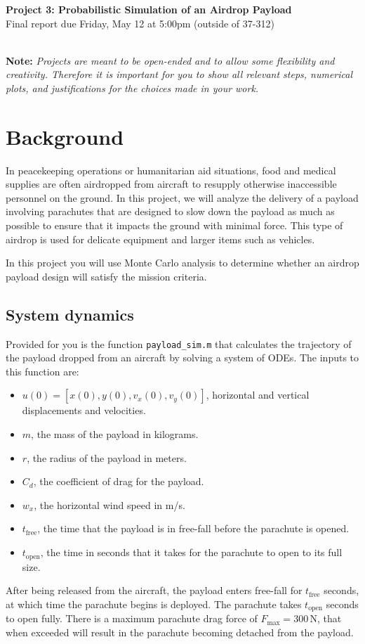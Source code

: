 \documentclass[11pt]{article}
\begin{document}
\begin{center}
\Large\textbf{Project 3: Probabilistic Simulation of an Airdrop Payload}\\[1em]
\normalsize Final report due Friday, May 12 at 5:00pm (outside of 37-312)
\end{center}
\hrulefill\\[1em]
\textbf{Note:} \textit{Projects are meant to be open-ended and to
  allow some flexibility and creativity. Therefore it is important
  for you to show all relevant steps, numerical plots, and
  justifications for the choices made in your work.}

\hrulefill

\section{Background}
In peacekeeping operations or humanitarian aid situations, food and
medical supplies are often airdropped from aircraft to resupply
otherwise inaccessible personnel on the ground. In this project, we
will analyze the delivery of a payload involving parachutes that are
designed to slow down the payload as much as possible to ensure that it impacts the ground with minimal force. This type of airdrop is used for delicate equipment and larger items such as vehicles.

In this project you will use Monte Carlo analysis to determine whether an airdrop payload design will satisfy the mission criteria.

\subsection{System dynamics}
Provided for you is the function \texttt{payload\_sim.m} that calculates the trajectory of the payload dropped from an aircraft by solving a system of ODEs. The inputs to this function are:
\begin{itemize}
  \item $u(0)=[x(0), y(0), v_x(0), v_y(0)]$, horizontal and vertical displacements and velocities.
  \item $m$, the mass of the payload in kilograms.
  \item $r$, the radius of the payload in meters.
  \item $C_d$, the coefficient of drag for the payload.
  \item $w_x$, the horizontal wind speed in m/s.
  \item $t_\text{free}$, the time that the payload is in free-fall before the parachute is opened.
  \item $t_\text{open}$, the time in seconds that it takes for the parachute to open to its full size.
\end{itemize}
After being released from the aircraft, the payload enters free-fall
for $t_\text{free}$ seconds, at which time the parachute begins is
deployed. The parachute takes $t_\text{open}$ seconds to open
fully. There is a maximum parachute drag force of $F_\text{max}=300\,\text{N}$, that when exceeded will result in the parachute becoming detached from the payload.
\end{document}
